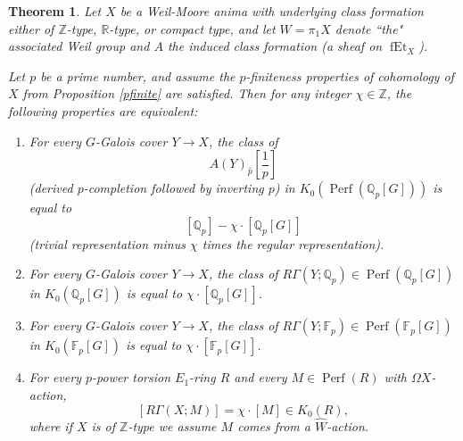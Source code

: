 \documentclass[12pt]{article}
\newtheorem{theorem}{Theorem}[section]
\theoremstyle{definition}
\newcommand{\on}{\operatorname}
\newcommand{\mbb}{\mathbb}
\newcommand{\wh}{\widehat}
\begin{document}
\begin{theorem}\label{chi}
Let $X$ be a Weil-Moore anima with underlying class formation either of $\mbb{Z}$-type, $\mbb{R}$-type, or compact type, and let $W=\pi_1X$ denote ``the" associated Weil group and $A$ the induced class formation (a sheaf on $\on{fEt}_X$).

Let $p$ be a prime number, and assume the $p$-finiteness properties of cohomology of $X$ from Proposition \ref{pfinite} are satisfied.  Then for any integer $\chi \in\mbb{Z}$, the following properties are equivalent:
\begin{enumerate}
\item For every $G$-Galois cover $Y\to X$, the class of
$$A(Y)_{\wh{p}}[\frac{1}{p}]$$
(derived $p$-completion followed by inverting $p$) in $K_0(\on{Perf}(\mbb{Q}_p[G]))$ is equal to
$$[\mbb{Q}_p] - \chi\cdot[\mbb{Q}_p[G]]$$
(trivial representation minus $\chi$ times the regular representation).
\item For every $G$-Galois cover $Y\to X$, the class of $R\Gamma(Y;\mbb{Q}_p)\in \on{Perf}(\mbb{Q}_p[G])$ in $K_0(\mbb{Q}_p[G])$ is equal to $\chi\cdot [\mbb{Q}_p[G]]$.
\item For every $G$-Galois cover $Y\to X$, the class of $R\Gamma(Y;\mbb{F}_p)\in \on{Perf}(\mbb{F}_p[G])$ in $K_0(\mbb{F}_p[G])$ is equal to $\chi\cdot [\mbb{F}_p[G]]$.
\item For every $p$-power torsion $E_1$-ring $R$ and every $M\in\on{Perf}(R)$ with $\Omega X$-action,
$$[R\Gamma(X;M)] = \chi\cdot [M] \in K_0(R),$$
where if $X$ is of $\mbb{Z}$-type we assume $M$ comes from a $\wh{W}$-action.
\end{enumerate}
\end{theorem}
\end{document}
